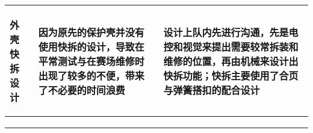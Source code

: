 \begin{longtable}{ p{2cm} | p{7.8cm} | p{6cm} |}
    \hline

        \rowcolor{gndcolor}
    
        \begin{center}
            外壳快拆设计 
        \end{center} &
        \begin{center}
            因为原先的保护壳并没有使用快拆的设计，导致在平常测试与在赛场维修时出现了较多的不便，带来了不必要的时间浪费
        \end{center} &
        \begin{center}
            设计上队内先进行沟通，先是电控和视觉来提出需要较常拆装和维修的位置，再由机械来设计出快拆功能；快拆主要使用了合页与弹簧搭扣的配合设计
        \end{center} \\

    \hline
    
        \begin{center}
            
        \end{center} &
        \begin{center}
            
        \end{center} &
        \begin{center}
            
        \end{center} \\
        
    \hline
    
        \begin{center}
            
        \end{center} &
        \begin{center}
            
        \end{center} &
        \begin{center}
            
        \end{center} \\

    \hline
    
        \begin{center}
            
        \end{center} &
        \begin{center}
            

\end{center}
\end{longtable}
